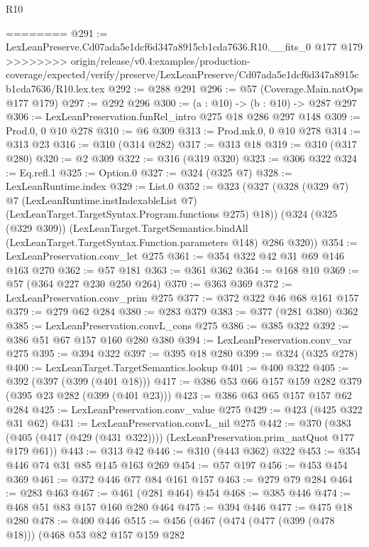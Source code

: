 \begin{lexlean}{R10}
\begin{coremodule}
{{{{{========
@291 := LexLeanPreserve.Cd07ada5e1dcf6d347a8915cb1cda7636.R10.__fits_0 @177 @179
>>>>>>>> origin/release/v0.4:examples/production-coverage/expected/verify/preserve/LexLeanPreserve/Cd07ada5e1dcf6d347a8915cb1cda7636/R10.lex.tex
@292 := @288 @291
@296 := @57 (Coverage.Main.natOps @177 @179)
@297 := @292 @296
@300 := (a : @10) -> (b : @10) -> @287 @297
@306 := LexLeanPreservation.funRel_intro @275 @18 @286 @297 @148
@309 := Prod.{0, 0} @10 @278
@310 := @6 @309
@313 := Prod.mk.{0, 0} @10 @278
@314 := @313 @23
@316 := @310 (@314 @282)
@317 := @313 @18
@319 := @310 (@317 @280)
@320 := @2 @309
@322 := @316 (@319 @320)
@323 := @306 @322
@324 := Eq.refl.{1}
@325 := Option.{0}
@327 := @324 (@325 @7)
@328 := LexLeanRuntime.index
@329 := List.{0}
@352 := @323
    (@327
      (@328
        (@329 @7)
        @7
        (LexLeanRuntime.instIndexableList @7)
        (LexLeanTarget.TargetSyntax.Program.functions @275)
        @18))
    (@324
      (@325 (@329 @309))
      (LexLeanTarget.TargetSemantics.bindAll
        (LexLeanTarget.TargetSyntax.Function.parameters @148)
        @286
        @320))
@354 := LexLeanPreservation.conv_let @275
@361 := @354 @322 @42 @31 @69 @146 @163 @270
@362 := @57 @181
@363 := @361 @362
@364 := @168 @10
@369 := @57 (@364 @227 @230 @250 @264)
@370 := @363 @369
@372 := LexLeanPreservation.conv_prim @275
@377 := @372 @322 @46 @68 @161 @157
@379 := @279 @62 @284
@380 := @283 @379
@383 := @377 (@281 @380) @362
@385 := LexLeanPreservation.convL_cons @275
@386 := @385 @322
@392 := @386 @51 @67 @157 @160 @280 @380
@394 := LexLeanPreservation.conv_var @275
@395 := @394 @322
@397 := @395 @18 @280
@399 := @324 (@325 @278)
@400 := LexLeanTarget.TargetSemantics.lookup
@401 := @400 @322
@405 := @392 (@397 (@399 (@401 @18)))
@417 := @386 @53 @66 @157 @159 @282 @379 (@395 @23 @282 (@399 (@401 @23)))
@423 := @386 @63 @65 @157 @157 @62 @284
@425 := LexLeanPreservation.conv_value @275
@429 := @423 (@425 @322 @31 @62)
@431 := LexLeanPreservation.convL_nil @275
@442 := @370
    (@383 (@405 (@417 (@429 (@431 @322)))) (LexLeanPreservation.prim_natQuot @177 @179 @61))
@443 := @313 @42
@446 := @310 (@443 @362) @322
@453 := @354 @446 @74 @31 @85 @145 @163 @269
@454 := @57 @197
@456 := @453 @454 @369
@461 := @372 @446 @77 @84 @161 @157
@463 := @279 @79 @284
@464 := @283 @463
@467 := @461 (@281 @464) @454
@468 := @385 @446
@474 := @468 @51 @83 @157 @160 @280 @464
@475 := @394 @446
@477 := @475 @18 @280
@478 := @400 @446
@515 := @456
    (@467
      (@474
        (@477 (@399 (@478 @18)))
        (@468
          @53
          @82
          @157
          @159
          @282
}}}}}
\end{coremodule}
\end{lexlean}
